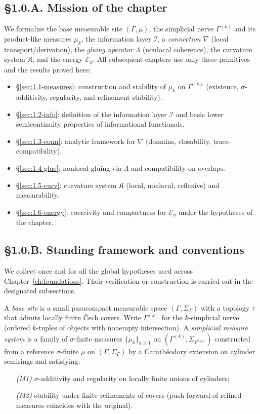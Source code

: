 \subsection*{§1.0.A. Mission of the chapter}
We formalize the base measurable site $(\Gamma,\mu)$, the simplicial nerve $\Gamma^{(k)}$ and its product-like measures $\mu_k$, the information layer $\mathcal I$, a \emph{connection} $\nabla$ (local transport/derivation), the \emph{gluing operator} $\Lambda$ (nonlocal coherence), the curvature system $\mathfrak K$, and the energy $\mathcal E_\phi$.
All subsequent chapters use only these primitives and the results proved here:
\begin{itemize}
  \item §\ref{sec:1.1-measures}: construction and stability of $\mu_k$ on $\Gamma^{(k)}$ (existence, $\sigma$-additivity, regularity, and refinement-stability).
  \item §\ref{sec:1.2-info}: definition of the information layer $\mathcal I$ and basic lower semicontinuity properties of informational functionals.
  \item §\ref{sec:1.3-conn}: analytic framework for $\nabla$ (domains, closability, trace-compatibility).
  \item §\ref{sec:1.4-glue}: nonlocal gluing via $\Lambda$ and compatibility on overlaps.
  \item §\ref{sec:1.5-curv}: curvature system $\mathfrak K$ (local, nonlocal, reflexive) and measurability.
  \item §\ref{sec:1.6-energy}: coercivity and compactness for $\mathcal E_\phi$ under the hypotheses of the chapter.
\end{itemize}

\subsection*{§1.0.B. Standing framework and conventions}
We collect once and for all the global hypotheses used across Chapter~\ref{ch:foundations}. 
Their verification or construction is carried out in the designated subsections.

\begin{definition}\label{def:1.0.site}
A \emph{base site} is a small paracompact measurable space $(\Gamma,\Sigma_\Gamma)$ with a topology $\tau$ that admits locally finite Čech covers. 
Write $\Gamma^{(k)}$ for the $k$-simplicial nerve (ordered $k$-tuples of objects with nonempty intersection). 
A \emph{simplicial measure system} is a family of $\sigma$-finite measures $\{\mu_k\}_{k\ge1}$ on $(\Gamma^{(k)},\Sigma_{\Gamma^{(k)}})$ constructed from a reference $\sigma$-finite $\mu$ on $(\Gamma,\Sigma_\Gamma)$ by a Carathéodory extension on cylinder semirings and satisfying:
\begin{enumerate}
  \item[\emph{(M1)}] $\sigma$-additivity and regularity on locally finite unions of cylinders;
  \item[\emph{(M2)}] stability under finite refinements of covers (push-forward of refined measures coincides with the original).
\end{enumerate}
\end{definition}

